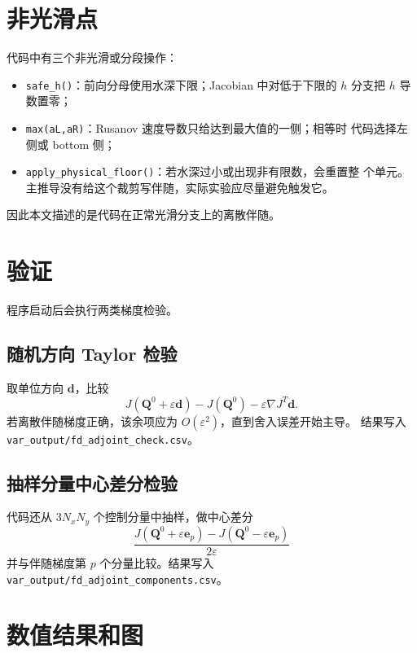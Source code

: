 \documentclass[12pt,a4paper]{article}
\begin{document}
\section{非光滑点}

代码中有三个非光滑或分段操作：
\begin{itemize}
\item \texttt{safe\_h()}：前向分母使用水深下限；Jacobian 中对低于下限的
      $h$ 分支把 $h$ 导数置零；
\item \texttt{max(aL,aR)}：Rusanov 速度导数只给达到最大值的一侧；相等时
      代码选择左侧或 bottom 侧；
\item \texttt{apply\_physical\_floor()}：若水深过小或出现非有限数，会重置整
      个单元。主推导没有给这个裁剪写伴随，实际实验应尽量避免触发它。
\end{itemize}
因此本文描述的是代码在正常光滑分支上的离散伴随。

\section{验证}

程序启动后会执行两类梯度检验。

\subsection{随机方向 Taylor 检验}

取单位方向 $\mathbf{d}$，比较
\begin{equation}
J(\mathbf{Q}^0+\varepsilon\mathbf{d})
-J(\mathbf{Q}^0)
-\varepsilon\nabla J^T\mathbf{d}.
\label{eq:taylor}
\end{equation}
若离散伴随梯度正确，该余项应为 $O(\varepsilon^2)$，直到舍入误差开始主导。
结果写入 \texttt{var\_output/fd\_adjoint\_check.csv}。

\subsection{抽样分量中心差分检验}

代码还从 $3N_xN_y$ 个控制分量中抽样，做中心差分
\begin{equation}
\frac{
J(\mathbf{Q}^0+\varepsilon\mathbf{e}_p)
-J(\mathbf{Q}^0-\varepsilon\mathbf{e}_p)
}{2\varepsilon}
\label{eq:component-fd}
\end{equation}
并与伴随梯度第 $p$ 个分量比较。结果写入
\texttt{var\_output/fd\_adjoint\_components.csv}。

\section{数值结果和图}
\end{document}
